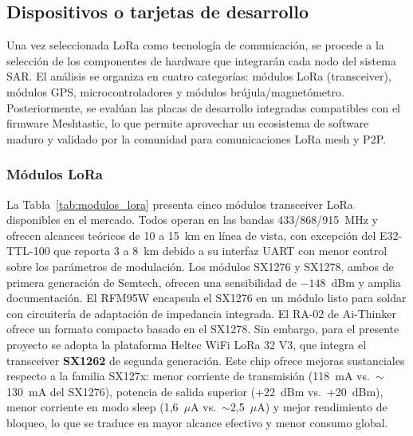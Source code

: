 \subsection{Dispositivos o tarjetas de desarrollo}

Una vez seleccionada LoRa como tecnología de comunicación, se procede a la selección de los componentes de hardware que integrarán cada nodo del sistema SAR. El análisis se organiza en cuatro categorías: módulos LoRa (transceiver), módulos GPS, microcontroladores y módulos brújula/magnetómetro. Posteriormente, se evalúan las placas de desarrollo integradas compatibles con el firmware Meshtastic, lo que permite aprovechar un ecosistema de software maduro y validado por la comunidad para comunicaciones LoRa mesh y P2P.

\subsubsection{Módulos LoRa}

La Tabla~\ref{tab:modulos_lora} presenta cinco módulos transceiver LoRa disponibles en el mercado. Todos operan en las bandas 433/868/915~MHz y ofrecen alcances teóricos de 10 a 15~km en línea de vista, con excepción del E32-TTL-100 que reporta 3 a 8~km debido a su interfaz UART con menor control sobre los parámetros de modulación. Los módulos SX1276 y SX1278, ambos de primera generación de Semtech, ofrecen una sensibilidad de $-148$~dBm y amplia documentación. El RFM95W encapsula el SX1276 en un módulo listo para soldar con circuitería de adaptación de impedancia integrada. El RA-02 de Ai-Thinker ofrece un formato compacto basado en el SX1278. Sin embargo, para el presente proyecto se adopta la plataforma Heltec WiFi LoRa 32 V3, que integra el transceiver \textbf{SX1262} de segunda generación. Este chip ofrece mejoras sustanciales respecto a la familia SX127x: menor corriente de transmisión (118~mA vs.\ $\sim$130~mA del SX1276), potencia de salida superior (+22~dBm vs.\ +20~dBm), menor corriente en modo sleep (1,6~$\mu$A vs.\ $\sim$2,5~$\mu$A) y mejor rendimiento de bloqueo, lo que se traduce en mayor alcance efectivo y menor consumo global.

